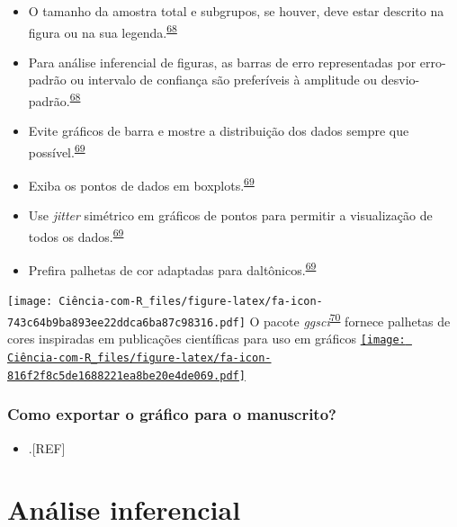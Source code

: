 \documentclass[
]{book}
\providecommand{\tightlist}{%
  \setlength{\itemsep}{0pt}\setlength{\parskip}{0pt}}
\begin{document}
\begin{itemize}
\item
  O tamanho da amostra total e subgrupos, se houver, deve estar descrito na figura ou na sua legenda.\textsuperscript{\protect\hyperlink{ref-Cumming2007}{68}}
\item
  Para análise inferencial de figuras, as barras de erro representadas por erro-padrão ou intervalo de confiança são preferíveis à amplitude ou desvio-padrão.\textsuperscript{\protect\hyperlink{ref-Cumming2007}{68}}
\item
  Evite gráficos de barra e mostre a distribuição dos dados sempre que possível.\textsuperscript{\protect\hyperlink{ref-Weissgerber2019}{69}}
\item
  Exiba os pontos de dados em boxplots.\textsuperscript{\protect\hyperlink{ref-Weissgerber2019}{69}}
\item
  Use \emph{jitter} simétrico em gráficos de pontos para permitir a visualização de todos os dados.\textsuperscript{\protect\hyperlink{ref-Weissgerber2019}{69}}
\item
  Prefira palhetas de cor adaptadas para daltônicos.\textsuperscript{\protect\hyperlink{ref-Weissgerber2019}{69}}
\end{itemize}

\texttt{[image: Ciência-com-R\_files/figure-latex/fa-icon-743c64b9ba893ee22ddca6ba87c98316.pdf]} O pacote \emph{ggsci}\textsuperscript{\protect\hyperlink{ref-ggsci}{70}} fornece palhetas de cores inspiradas em publicações científicas para uso em gráficos \href{https://cran.r-project.org/web/packages/ggsci/index.html}{\texttt{[image: Ciência-com-R\_files/figure-latex/fa-icon-816f2f8c5de1688221ea8be20e4de069.pdf]}}

\hypertarget{como-exportar-o-gruxe1fico-para-o-manuscrito}{%
\subsection{Como exportar o gráfico para o manuscrito?}\label{como-exportar-o-gruxe1fico-para-o-manuscrito}}

\begin{itemize}
\tightlist
\item
  .{[}REF{]}
\end{itemize}

\hypertarget{analise-inferencial}{%
\chapter{\texorpdfstring{\textbf{Análise inferencial}}{Análise inferencial}}\label{analise-inferencial}}
\end{document}

